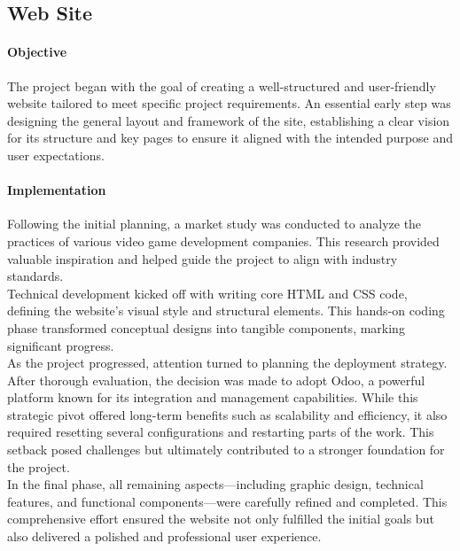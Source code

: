 \documentclass{article}
\begin{document}
\newpage
\subsection{Web Site}
\paragraph{Objective}\hfill

The project began with the goal of creating a well-structured and user-friendly website tailored to meet specific project requirements. An essential early step was designing the general layout and framework of the site, establishing a clear vision for its structure and key pages to ensure it aligned with the intended purpose and user expectations.

\paragraph{Implementation}\hfill

Following the initial planning, a market study was conducted to analyze the practices of various video game development companies. This research provided valuable inspiration and helped guide the project to align with industry standards.\\

Technical development kicked off with writing core HTML and CSS code, defining the website's visual style and structural elements. This hands-on coding phase transformed conceptual designs into tangible components, marking significant progress.\\

As the project progressed, attention turned to planning the deployment strategy. After thorough evaluation, the decision was made to adopt Odoo, a powerful platform known for its integration and management capabilities. While this strategic pivot offered long-term benefits such as scalability and efficiency, it also required resetting several configurations and restarting parts of the work. This setback posed challenges but ultimately contributed to a stronger foundation for the project.\\

In the final phase, all remaining aspects—including graphic design, technical features, and functional components—were carefully refined and completed. This comprehensive effort ensured the website not only fulfilled the initial goals but also delivered a polished and professional user experience.
\end{document}
